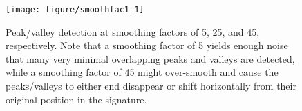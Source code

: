 \documentclass[aoas, preprint]{imsart}\usepackage[]{graphicx}\usepackage[]{color}
\newenvironment{knitrout}{}{} %
\begin{document}
\begin{figure}[hbtp]
  \centering
\begin{knitrout}
\color{fgcolor}
\texttt{[image: figure/smoothfac1-1]} 

\end{knitrout}
\caption{\label{fig:varysmooth} Peak/valley detection at smoothing factors of 5, 25, and 45, respectively. Note that a smoothing factor of 5 yields enough noise that many very minimal overlapping peaks and valleys are detected, while a smoothing factor of 45 might over-smooth and cause the peaks/valleys to either end disappear or shift  horizontally from their original position in the signature.}
\end{figure}
\end{document}
